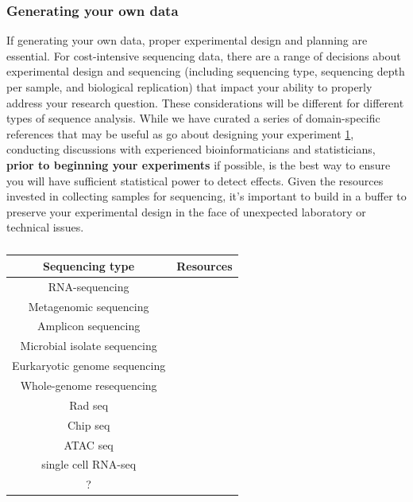 \documentclass[10pt,letterpaper]{article}
\begin{document}
\subsubsection*{Generating your own data}
If generating your own data, proper experimental design and planning are essential. 
For cost-intensive sequencing data, there are a range of decisions about experimental design and sequencing (including sequencing type, sequencing depth per sample, and biological replication) that impact your ability to properly address your research question. 
These considerations will be different for different types of sequence analysis. 
While we have curated a series of domain-specific references that may be useful as go about designing your experiment \ref{tab:seq_resources}, conducting discussions with experienced bioinformaticians and statisticians, \textbf{prior to beginning your experiments} if possible, is the best way to ensure you will have sufficient statistical power to detect effects.
Given the resources invested in collecting samples for sequencing, it's important to build in a buffer to preserve your experimental design in the face of unexpected laboratory or technical issues. 

\begin{table}
\begin{tabular}{|c|c|}
\hline
\textbf{Sequencing type} & \textbf{Resources} \\
\hline
RNA-sequencing & \cite{conesa2016, schurch2016, ching2014} \\
\hline
Metagenomic sequencing & \cite{knight2012, quince2017, eisenhofer2019} \\
\hline
Amplicon sequencing & \cite{mclaren2019, murray2015, sinha2017 } \\
\hline
Microbial isolate sequencing & \cite{liao2015} \\
\hline
Eurkaryotic genome sequencing & \\
\hline
Whole-genome resequencing & \cite{fuentes2017} \\
\hline
Rad seq & \\
\hline
Chip seq & \\
\hline
ATAC seq & \\
\hline
single cell RNA-seq & \cite{bacher2016, haque2017} \\
\hline
? & \\
\hline
\end{tabular} 
\caption{\label{tab:seq_resources}}
\end{table}
\end{document}
